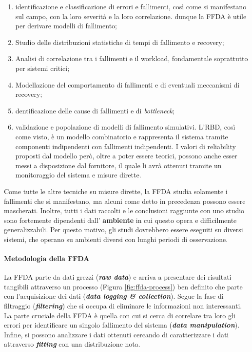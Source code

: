 \documentclass{article}
\begin{document}
\begin{enumerate}
  \item identificazione e classificazione di errori e fallimenti, così come si manifestano 
    sul campo, con la loro severità e la loro correlazione. dunque la FFDA è utile per 
    derivare modelli di fallimento;
  \item Studio delle distribuzioni statistiche di tempi di fallimento e recovery;
  \item Analisi di correlazione tra i fallimenti e il workload, fondamentale soprattutto
    per sistemi critici;
  \item Modellazione del comportamento di fallimenti e di eventuali meccanismi di recovery;
  \item dentificazione delle cause di fallimenti e di \textit{bottleneck};
  \item validazione e popolazione di modelli di fallimento simulativi. L’RBD, così come
    visto, è un modello combinatorio e rappresenta il sistema tramite componenti 
    indipendenti con fallimenti indipendenti. I valori di reliability proposti dal modello 
    però, oltre a poter essere teorici, possono anche esser messi a disposizione dal 
    fornitore, il quale li avrà ottenuti tramite un monitoraggio del sistema e misure 
    dirette.
\end{enumerate}

Come tutte le altre tecniche su misure dirette, la FFDA studia solamente i fallimenti che si 
manifestano, ma alcuni come detto in precedenza possono essere mascherati. Inoltre, tutti i 
dati raccolti e le conclusioni raggiunte con uno studio sono fortemente dipendenti dall'
\textbf{ambiente} in cui questo opera e difficilmente generalizzabili. Per questo motivo, 
gli studi dovrebbero essere eseguiti su diversi sistemi, che operano su ambienti diversi 
con lunghi periodi di osservazione.

\paragraph{Metodologia della FFDA}La FFDA parte da dati grezzi (\textbf{\textit{raw data}}) 
e arriva a presentare dei risultati tangibili attraverso un processo (Figura
\ref{fig:ffda-process}) ben definito che parte con l'acquisizione dei dati
(\textbf{\textit{data logging & collection}}). Segue la fase di filtraggio
(\textbf{\textit{filtering}}) che si occupa di eliminare le informazioni non interessanti.
La parte cruciale della FFDA è quella con cui si cerca di correlare tra loro gli errori per
identificare un singolo fallimento del sistema (\textbf{\textit{data manipulation}}). 
Infine, si possono analizzare i dati ottenuti cercando di caratterizzare i dati 
attraverso \textbf{\textit{fitting}} con una distribuzione nota.
\end{document}
